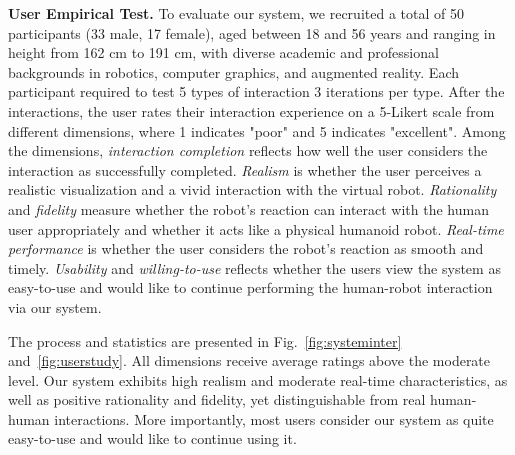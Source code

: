 \noindent\textbf{User Empirical Test.} To evaluate our system, we recruited a total of 50 participants (33 male, 17 female), aged between 18 and 56 years and ranging in height from 162 cm to 191 cm, with diverse academic and professional backgrounds in robotics, computer graphics, and augmented reality. Each participant required to test 5 types of interaction 3 iterations per type. %
After the interactions, the user rates their interaction experience on a 5-Likert scale from different dimensions, where 1 indicates "poor" and 5 indicates "excellent".
Among the dimensions, 
\emph{interaction completion} reflects how well the user considers the interaction as successfully completed. \emph{Realism} is whether the user perceives a realistic visualization and a vivid interaction with the virtual robot. \emph{Rationality} and 
\emph{fidelity} measure whether the robot's reaction can interact with the human user appropriately and whether it acts like a physical humanoid robot. \emph{Real-time performance} is whether the user considers the robot's reaction as smooth and timely. 
\emph{Usability} and \emph{willing-to-use} reflects whether the users view the system as easy-to-use and would like to continue performing the human-robot interaction via our system.

The process and statistics are presented in Fig.~\ref{fig:systeminter} and~\ref{fig:userstudy}. All dimensions receive average ratings above the moderate level. Our system exhibits high realism and moderate real-time characteristics, as well as positive rationality and fidelity, yet distinguishable from real human-human interactions. More importantly, most users consider our system as quite easy-to-use and would like to continue using it. 

